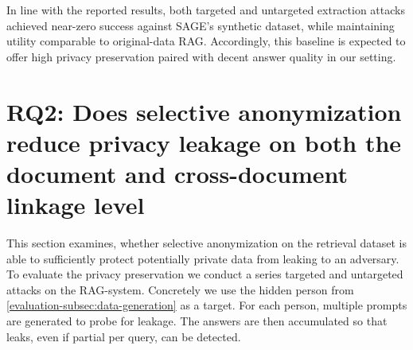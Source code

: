 In line with the reported results, both targeted and untargeted extraction attacks achieved near-zero success against SAGE's synthetic dataset, while maintaining utility comparable to original-data \ac{RAG}. Accordingly, this baseline is expected to offer high privacy preservation paired with decent answer quality in our setting.




\section{RQ2: Does selective anonymization reduce privacy leakage on both the document and cross-document linkage level}
This section examines, whether selective anonymization on the retrieval dataset is able to sufficiently protect potentially private data from leaking to an adversary. To evaluate the privacy preservation we conduct a series targeted and untargeted attacks on the \ac{RAG}-system. Concretely we use the hidden person from \ref{evaluation-subsec:data-generation} as a target. For each person, multiple prompts are generated to probe for leakage. The answers are then accumulated so that leaks, even if partial per query, can be detected.

